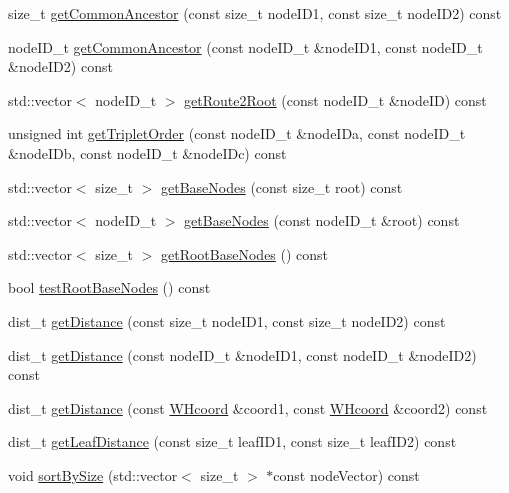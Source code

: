 \begin{DoxyCompactItemize}
size\-\_\-t \hyperlink{classWHtree_a4dc2606d76140ba2e47e8d336dc0ef06}{get\-Common\-Ancestor} (const size\-\_\-t node\-I\-D1, const size\-\_\-t node\-I\-D2) const 
\item 
node\-I\-D\-\_\-t \hyperlink{classWHtree_aeb15be3e2c18384d6fb36ce38a64f795}{get\-Common\-Ancestor} (const node\-I\-D\-\_\-t \&node\-I\-D1, const node\-I\-D\-\_\-t \&node\-I\-D2) const 
\item 
std\-::vector$<$ node\-I\-D\-\_\-t $>$ \hyperlink{classWHtree_a089e58eee47582beeabf8a2a2b2a72de}{get\-Route2\-Root} (const node\-I\-D\-\_\-t \&node\-I\-D) const 
\item 
unsigned int \hyperlink{classWHtree_afafbcc4854af05430f68716da6dcf15d}{get\-Triplet\-Order} (const node\-I\-D\-\_\-t \&node\-I\-Da, const node\-I\-D\-\_\-t \&node\-I\-Db, const node\-I\-D\-\_\-t \&node\-I\-Dc) const 
\item 
std\-::vector$<$ size\-\_\-t $>$ \hyperlink{classWHtree_a5d37053a08788138498c80167713f372}{get\-Base\-Nodes} (const size\-\_\-t root) const 
\item 
std\-::vector$<$ node\-I\-D\-\_\-t $>$ \hyperlink{classWHtree_a738b06e4dea9b1bedb4fdb43273599a0}{get\-Base\-Nodes} (const node\-I\-D\-\_\-t \&root) const 
\item 
std\-::vector$<$ size\-\_\-t $>$ \hyperlink{classWHtree_abbdb2132e3114a12c07bcb42af832134}{get\-Root\-Base\-Nodes} () const 
\item 
bool \hyperlink{classWHtree_a2ce2301182542eb6cafd8b212a15be66}{test\-Root\-Base\-Nodes} () const 
\item 
dist\-\_\-t \hyperlink{classWHtree_ac9ac003a5bb8734f79c4b0a285a40344}{get\-Distance} (const size\-\_\-t node\-I\-D1, const size\-\_\-t node\-I\-D2) const 
\item 
dist\-\_\-t \hyperlink{classWHtree_a8a08e4cfbbeaa3a54930693bf04f310f}{get\-Distance} (const node\-I\-D\-\_\-t \&node\-I\-D1, const node\-I\-D\-\_\-t \&node\-I\-D2) const 
\item 
dist\-\_\-t \hyperlink{classWHtree_aa20e44655a0cadd64746d8019fea16af}{get\-Distance} (const \hyperlink{classWHcoord}{\-W\-Hcoord} \&coord1, const \hyperlink{classWHcoord}{\-W\-Hcoord} \&coord2) const 
\item 
dist\-\_\-t \hyperlink{classWHtree_a16ff893f6799ed8837c0a11bde4b8978}{get\-Leaf\-Distance} (const size\-\_\-t leaf\-I\-D1, const size\-\_\-t leaf\-I\-D2) const 
\item 
void \hyperlink{classWHtree_ab35a13b352c7c37f3269f86d09afa02b}{sort\-By\-Size} (std\-::vector$<$ size\-\_\-t $>$ $\ast$const node\-Vector) const 

\end{DoxyCompactItemize}
